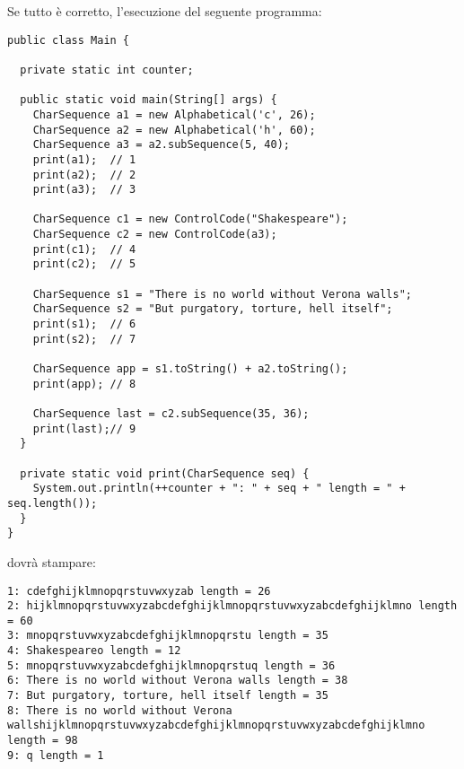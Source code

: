 \documentclass{article}[10pt]
\begin{document}
\newpage

Se tutto \`e corretto, l'esecuzione del seguente programma:

{\small\begin{verbatim}
public class Main {

  private static int counter;

  public static void main(String[] args) {
    CharSequence a1 = new Alphabetical('c', 26);
    CharSequence a2 = new Alphabetical('h', 60);
    CharSequence a3 = a2.subSequence(5, 40);
    print(a1);  // 1
    print(a2);  // 2
    print(a3);  // 3

    CharSequence c1 = new ControlCode("Shakespeare");
    CharSequence c2 = new ControlCode(a3);
    print(c1);  // 4
    print(c2);  // 5

    CharSequence s1 = "There is no world without Verona walls";
    CharSequence s2 = "But purgatory, torture, hell itself";
    print(s1);  // 6
    print(s2);  // 7

    CharSequence app = s1.toString() + a2.toString();
    print(app); // 8

    CharSequence last = c2.subSequence(35, 36);
    print(last);// 9
  }

  private static void print(CharSequence seq) {
    System.out.println(++counter + ": " + seq + " length = " + seq.length());
  }
}
\end{verbatim}}

\noindent
dovr\`a stampare:

{\small\begin{verbatim}
1: cdefghijklmnopqrstuvwxyzab length = 26
2: hijklmnopqrstuvwxyzabcdefghijklmnopqrstuvwxyzabcdefghijklmno length = 60
3: mnopqrstuvwxyzabcdefghijklmnopqrstu length = 35
4: Shakespeareo length = 12
5: mnopqrstuvwxyzabcdefghijklmnopqrstuq length = 36
6: There is no world without Verona walls length = 38
7: But purgatory, torture, hell itself length = 35
8: There is no world without Verona wallshijklmnopqrstuvwxyzabcdefghijklmnopqrstuvwxyzabcdefghijklmno length = 98
9: q length = 1
\end{verbatim}}
\end{document}
